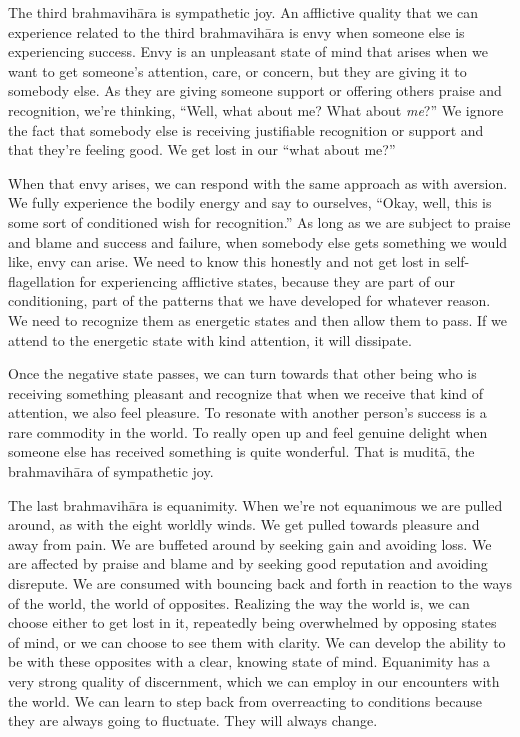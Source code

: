 The third brahmavihāra is sympathetic joy. An afflictive quality that we can experience related to the third brahmavihāra is envy when someone else is experiencing success. Envy is an unpleasant state of mind that arises when we want to get someone's attention, care, or concern, but they are giving it to somebody else. As they are giving someone support or offering others praise and recognition, we're thinking, ``Well, what about me? What about \emph{me}?'' We ignore the fact that somebody else is receiving justifiable recognition or support and that they're feeling good. We get lost in our ``what about me?''

When that envy arises, we can respond with the same approach as with aversion. We fully experience the bodily energy and say to ourselves, ``Okay, well, this is some sort of conditioned wish for recognition.'' As long as we are subject to praise and blame and success and failure, when somebody else gets something we would like, envy can arise. We need to know this honestly and not get lost in self-flagellation for experiencing afflictive states, because they are part of our conditioning, part of the patterns that we have developed for whatever reason. We need to recognize them as energetic states and then allow them to pass. If we attend to the energetic state with kind attention, it will dissipate.

Once the negative state passes, we can turn towards that other being who is receiving something pleasant and recognize that when we receive that kind of attention, we also feel pleasure. To resonate with another person's success is a rare commodity in the world. To really open up and feel genuine delight when someone else has received something is quite wonderful. That is muditā, the brahmavihāra of sympathetic joy.

The last brahmavihāra is equanimity. When we're not equanimous we are pulled around, as with the eight worldly winds. We get pulled towards pleasure and away from pain. We are buffeted around by seeking gain and avoiding loss. We are affected by praise and blame and by seeking good reputation and avoiding disrepute. We are consumed with bouncing back and forth in reaction to the ways of the world, the world of opposites. Realizing the way the world is, we can choose either to get lost in it, repeatedly being overwhelmed by opposing states of mind, or we can choose to see them with clarity. We can develop the ability to be with these opposites with a clear, knowing state of mind. Equanimity has a very strong quality of discernment, which we can employ in our encounters with the world. We can learn to step back from overreacting to conditions because they are always going to fluctuate. They will always change.


